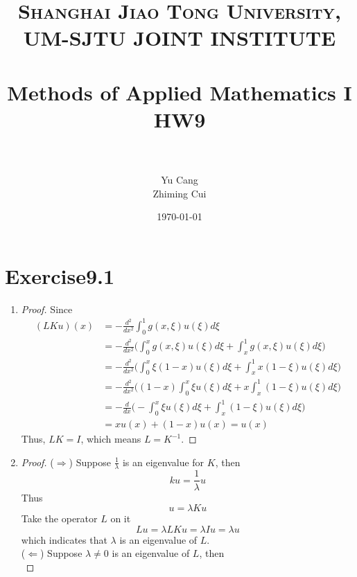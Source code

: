 \documentclass[paper=a4, fontsize=11pt]{scrartcl} %
\title{	
\normalfont \normalsize 
\textsc{Shanghai Jiao Tong University, UM-SJTU JOINT INSTITUTE} \\ [25pt] %
\horrule{0.5pt} \\[0.4cm] %
\huge Methods of Applied Mathematics I\\ HW9 \\ %
\horrule{2pt} \\[0.5cm] %
}
\author{Yu Cang \quad 018370210001\\ Zhiming Cui \quad 017370910006} %
\date{\normalsize \today} %
\numberwithin{equation}{section} %
\numberwithin{figure}{section} %
\numberwithin{table}{section} %
\begin{document}
\maketitle %

\section{Exercise9.1}
	\begin{enumerate}
		\item
			\begin{proof}
				Since
				\begin{equation}
					\begin{aligned}
						(LKu)(x) & = -\frac{d^2}{d x^2} \int_{0}^{1} g(x, \xi) u(\xi) d\xi\\
								 & = -\frac{d^2}{d x^2} \Bigg(\int_{0}^{x} g(x, \xi) u(\xi) d\xi + \int_{x}^{1} g(x, \xi) u(\xi) d\xi \Bigg)\\
								 & = -\frac{d^2}{d x^2} \Bigg(\int_{0}^{x} \xi(1-x) u(\xi) d\xi + \int_{x}^{1} x(1-\xi) u(\xi) d\xi \Bigg)\\
								 & = -\frac{d^2}{d x^2} \Bigg((1-x)\int_{0}^{x} \xi u(\xi) d\xi + x\int_{x}^{1} (1-\xi) u(\xi) d\xi \Bigg)\\
								 & = -\frac{d}{d x} \Bigg(-\int_{0}^{x} \xi u(\xi) d\xi + \int_{x}^{1} (1-\xi) u(\xi) d\xi \Bigg)\\
								 & = xu(x) + (1-x) u(x) = u(x)
 					\end{aligned}
				\end{equation}
				Thus, $LK=I$, which means $L = K^{-1}$.
			\end{proof}
		\item 
			\begin{proof}
				($\Rightarrow$) Suppose $\frac{1}{\lambda}$ is an eigenvalue for $K$, then
				\begin{equation}
					ku = \frac{1}{\lambda}u
				\end{equation} 
				Thus
				\begin{equation}
					u = \lambda K u
				\end{equation}
				Take the operator $L$ on it
				\begin{equation}
					Lu = \lambda LKu = \lambda Iu = \lambda u
				\end{equation}
				which indicates that $\lambda$ is an eigenvalue of $L$.\\
				($\Leftarrow$) Suppose $\lambda \neq 0$ is an eigenvalue of $L$, then
				\begin{equation}

\end{equation}
\end{proof}
\end{enumerate}
\end{document}
